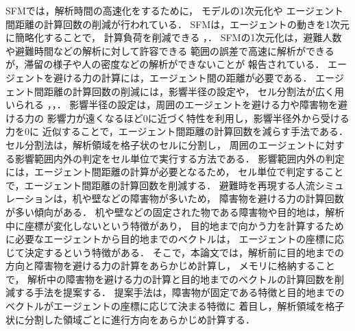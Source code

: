 SFMでは，解析時間の高速化をするために，
モデルの1次元化や
エージェント間距離の計算回数の削減が行われている．
%
SFMは，エージェントの動きを1次元に簡略化することで，
計算負荷を削減できる
\cite{1ji_sfm1}，\cite{1ji_sfm2}．
SFMの1次元化は，避難人数や避難時間などの解析に対して許容できる
範囲の誤差で高速に解析ができるが，滞留の様子や人の密度などの解析ができないことが
報告されている\cite{1ji_sfm1}．
%
エージェントを避ける力の計算には，エージェント間の距離が必要である．
エージェント間距離の計算回数の削減には，影響半径の設定や，
セル分割法が広く用いられる
\cite{seru_sfm1}，\cite{seru_sfm2}，\cite{katayose}．
影響半径の設定は，周囲のエージェントを避ける力や障害物を避ける力の
影響力が遠くなるほど0に近づく特性を利用し，影響半径外から受ける力を0に
近似することで，エージェント間距離の計算回数を減らす手法である．
セル分割法は，解析領域を格子状のセルに分割し，
周囲のエージェントに対する影響範囲内外の判定をセル単位で実行する方法である．
影響範囲内外の判定には，エージェント間距離の計算が必要となるため，
セル単位で判定することで，エージェント間距離の計算回数を削減する．
避難時を再現する人流シミュレーションは，机や壁などの障害物が多いため，
障害物を避ける力の計算回数が多い傾向がある．
机や壁などの固定された物である障害物や目的地は，解析中に座標が変化しないという特徴があり，
目的地まで向かう力を計算するために必要なエージェントから目的地までのベクトルは，
エージェントの座標に応じて決定するという特徴がある．
そこで，本論文では，解析前に目的地までの方向と障害物を避ける力の計算をあらかじめ計算し，
メモリに格納することで，
解析中の障害物を避ける力の計算と目的地までのベクトルの計算回数を削減する手法を提案する．
提案手法は，障害物が固定である特徴と目的地までのベクトルがエージェントの座標に応じて決まる特徴に
着目し，解析領域を格子状に分割した領域ごとに進行方向をあらかじめ計算する．
\fi 




